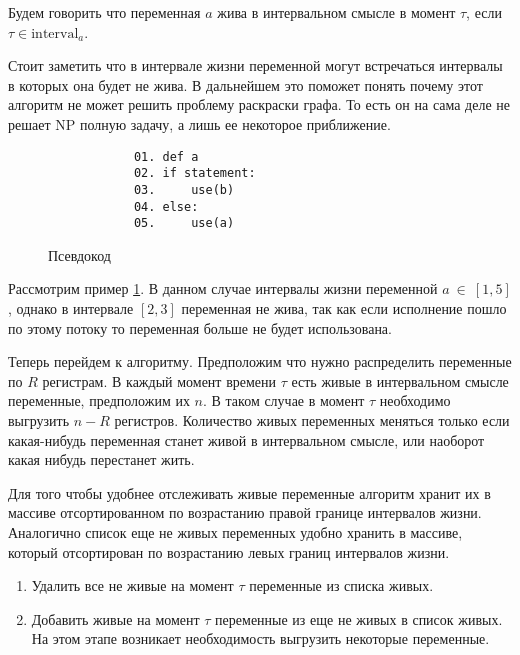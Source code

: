 \begin{definition}
    Будем говорить что переменная $a$ жива в интервальном смысле в момент $\tau$, если $\tau \in \text{interval}_a$. 
\end{definition}

Стоит заметить что в интервале жизни переменной могут встречаться интервалы в которых она будет
не жива. В дальнейшем это поможет понять почему этот алгоритм не может решить проблему раскраски графа. То
есть он на сама деле не решает NP полную задачу, а лишь ее некоторое приближение.

\begin{example}
    \begin{figure}
        \centering
        \lstset{basicstyle=\ttfamily\small, frame=single}
        \begin{lstlisting}
            01. def a
            02. if statement:
            03.     use(b)
            04. else:
            05.     use(a)
        \end{lstlisting}
        \caption{Псевдокод}
        \label{fig:example_live_intervals}
    \end{figure}

    Рассмотрим пример \ref{fig:example_live_intervals}. В данном случае интервалы жизни переменной
    $a~\in~[1,5]$, однако в интервале $[2,3]$ переменная не жива, так как если исполнение пошло по этому потоку
    то переменная больше не будет использована.
    
\end{example}

Теперь перейдем к алгоритму. Предположим что нужно распределить переменные по $R$ регистрам. В каждый момент
времени $\tau$ есть живые в интервальном смысле переменные, предположим их $n$. В таком случае в момент $\tau$
необходимо выгрузить $n - R$ регистров. Количество живых переменных меняться только если какая-нибудь
переменная станет живой в интервальном смысле, или наоборот какая нибудь перестанет жить.

Для того чтобы удобнее отслеживать живые переменные алгоритм хранит их в массиве отсортированном по
возрастанию правой границе интервалов жизни. Аналогично список еще не живых переменных удобно хранить в массиве,
который отсортирован по возрастанию левых границ интервалов жизни.

\begin{enumerate}
    \item Удалить все не живые на момент $\tau$ переменные из списка живых. \label{poleto_alg:delete_death}
    \item Добавить живые на момент $\tau$ переменные из еще не живых в список живых. На этом этапе
    возникает необходимость выгрузить некоторые переменные. \label{poleto_alg:add_alive}
\end{enumerate}

